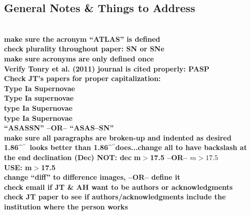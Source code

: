 \documentclass[aps,prb,twocolumn,superscriptaddress]{revtex4-1}
\def\arcsec{\ifmmode^{\prime\prime}\else$^{\prime\prime}$\fi}
\begin{document}
\clearpage
\begin{widetext} %
 \section{General Notes \& Things to Address}
 \\
 {\bf make sure the acronym ``ATLAS'' is defined\\}
 {\bf check plurality throughout paper: SN or SNe\\}
 {\bf make sure acronyms are only defined once\\}
 {\bf Verify Tonry et al. (2011) journal is cited properly: PASP\\}
 {\bf Check JT's papers for proper capitalization:\\
 \indent Type Ia Supernovae\\
 \indent Type Ia supernovae\\
 \indent type Ia Supernovae\\
 \indent type Ia Supernovae\\}
 {\bf ``ASASSN'' --OR-- ``ASAS--SN''\\}
 {\bf make sure all paragraphs are broken-up and indented as desired\\}
 {\bf 1.86\arcsec\ looks better than 1.86\arcsec does...change all to have backslash at the end}
 {\bf declination (Dec) NOT: dec}
 {\bf m$>$17.5 --OR-- $m>17.5$\\
 \indent USE: m$>$17.5}\\
 {\bf change ``diff'' to difference images, --OR-- define it}\\ 
 {\bf check email if JT \& AH want to be authors or acknowledgments}\\
 {\bf check JT paper to see if authors/acknowledgments include the institution where the person works}\\
\end{widetext}
\end{document}
